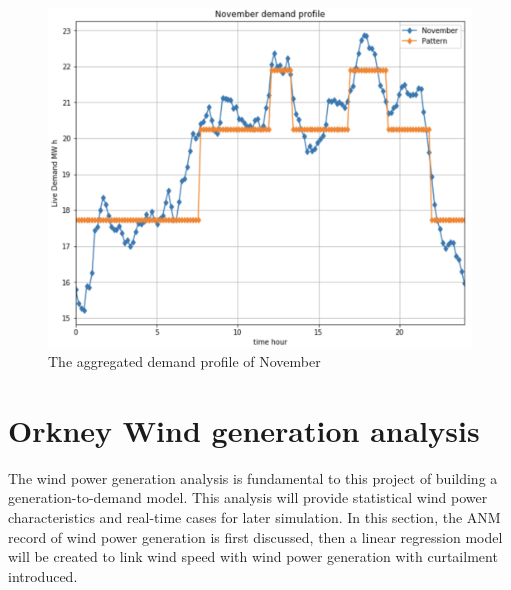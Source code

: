 \documentclass[12pt,a4paper]{report}
\begin{document}
                    \begin{figure}[ht]
                        \centerline{\includegraphics[scale=1]{november_demand_profile}}
                        \caption{The aggregated demand profile of November}
                        \label{plot_november_demand_profile}
                    \end{figure}
                
        \section{Orkney Wind generation analysis}
        The wind power generation analysis is fundamental to this project of building a generation-to-demand model. This analysis will provide statistical wind power characteristics and real-time cases for later simulation. In this section, the ANM record of wind power generation is first discussed, then a linear regression model will be created to link wind speed with wind power generation with curtailment introduced.
\end{document}
